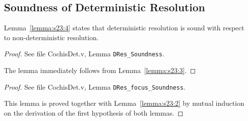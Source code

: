 \subsection{Soundness of Deterministic Resolution}

Lemma~\ref{lemma:s23:4} states that deterministic resolution is
sound with respect to non-deterministic resolution. 

{\centering
{}}
\begin{proof}
See file CochisDet.v, Lemma \texttt{DRes\_Soundness}.

The lemma immediately follows from Lemma~\ref{lemma:s23:3}.
\end{proof} 
{\centering
{}}
\begin{proof}
See file CochisDet.v, Lemma \texttt{DRes\_focus\_Soundness}.

This lemma is proved together with Lemma~\ref{lemma:s23:2} by mutual induction on the derivation of the first hypothesis of both lemmas.
\end{proof}
